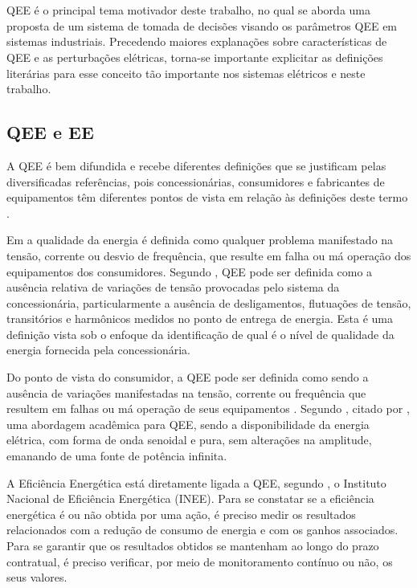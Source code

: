 \chapter{\capdois}\label{qeeDIS}

QEE é o principal tema motivador deste trabalho, no qual se aborda uma proposta de um sistema de tomada de decisões visando os parâmetros QEE em sistemas industriais. Precedendo maiores explanações sobre características de QEE e as perturbações elétricas, torna-se importante explicitar as definições literárias para esse conceito tão importante nos sistemas elétricos e neste trabalho.

\section{QEE e EE}\label{qeeEE}
\par 
A QEE é bem difundida e recebe diferentes definições que se justificam pelas diversificadas referências, pois concessionárias, consumidores e fabricantes de equipamentos têm diferentes pontos de vista em relação às definições deste termo \cite{FER99}.
\par 
Em \cite{DUG96} a qualidade da energia é definida como qualquer problema manifestado na tensão, corrente ou desvio de frequência, que resulte em falha ou má operação dos equipamentos dos consumidores. Segundo \cite{FER99}, QEE pode ser definida como a ausência relativa de variações de tensão provocadas pelo sistema da concessionária, particularmente a ausência de desligamentos, flutuações de tensão, transitórios e harmônicos medidos no ponto de entrega de energia. Esta é uma definição vista sob o enfoque da identificação de qual é o nível de qualidade da energia fornecida pela concessionária.
\par
Do ponto de vista do consumidor, a QEE pode ser definida como sendo a ausência de variações manifestadas na tensão, corrente ou frequência que resultem em falhas ou má operação de seus equipamentos \cite{DUG96}.
Segundo \cite{SBQEE}, citado por \cite{FER99}, uma abordagem acadêmica para QEE, sendo a disponibilidade da energia elétrica, com forma de onda senoidal e pura, sem alterações na amplitude, emanando de uma fonte de potência infinita. 
\par 
A Eficiência Energética está diretamente ligada a QEE, segundo \cite{INE12}, o Instituto Nacional de Eficiência Energética (INEE). Para se constatar se a eficiência energética é ou não obtida por uma ação, é preciso medir os resultados relacionados com a redução de consumo de energia e com os ganhos associados. Para se garantir que os resultados obtidos se mantenham ao longo do prazo contratual, é preciso verificar, por meio de monitoramento contínuo ou não, os seus valores.
